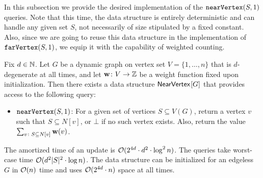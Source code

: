 
In this subsection we provide the desired implementation of the $\mathtt{nearVertex}(S,1)$ queries. Note that this time, the data structure is entirely deterministic and can handle any given set $S$, not necessarily of size stipulated by a fixed constant. Also, since we are going to reuse this data structure in the implementation of $\mathtt{farVertex}(S,1)$, we equip it with the capability of weighted counting.

\begin{theorem}\label{thm:NearVertex-new-deg}
	Fix $d\in \mathbb{N}$.
	Let $G$ be a dynamic graph on vertex set $V=\{1,\ldots,n\}$ that is $d$-degenerate at all times, and let $\mathbf{w}\colon V\to \mathbb{Z}$ be a weight function fixed upon initialization. Then there exists a data structure $\mathsf{NearVertex}_{}[G]$ that provides access to the following query:
	\begin{itemize}
		\item $\mathtt{nearVertex}(S,1)$: For a given set of vertices $S\subseteq V(G)$, return a vertex $v$ such that $S\subseteq N[v]$, or $\bot$ if no such vertex exists. Also, return the value $\sum_{v\colon S\subseteq N[v]} \mathbf{w}(v)$.
	\end{itemize}
	The amortized time of an update is $\mathcal{O}(2^{4d}\cdot d^2\cdot \log^2 n)$. The queries take worst-case time $\mathcal{O}(d^2|S|^2\cdot\log n)$. The data structure can be initialized for an edgeless $G$ in $\mathcal{O}(n)$ time and uses $\mathcal{O}(2^{4d}\cdot n)$ space at all times.
\end{theorem}
